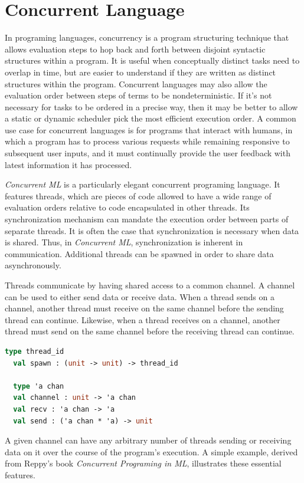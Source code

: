 \documentclass[10pt]{article}
\begin{document}
\section{Concurrent Language}
In programing languages, concurrency is a program structuring technique that allows evaluation
steps to hop back and forth between disjoint syntactic structures within a program.
It is useful
when conceptually distinct tasks need to overlap in time, but are easier to understand if they
are written as distinct structures within the program. Concurrent languages may also allow the
evaluation order between steps of terms to be nondeterministic. If it's not necessary for
tasks to be ordered in a precise way, then it may be better to allow a static or dynamic
scheduler pick the most efficient execution order. A common use case for concurrent languages
is for programs that interact with humans, in which a program has to process various requests
while remaining responsive to subsequent user inputs, and it must continually provide the user
feedback with latest information it has processed.

\textit{Concurrent ML} is a particularly elegant concurrent programing language.
It features threads, which are pieces of code allowed to have a wide range of
evaluation orders relative to code encapsulated in other threads. Its synchronization
mechanism can mandate the execution order between parts of separate threads. It is often the
case that synchronization is necessary when data is shared. Thus, in \textit{Concurrent ML},
synchronization is inherent in communication. Additional threads can be spawned
in order to share data asynchronously.

Threads communicate by having shared access to a common channel. A channel can be used to
either send data or receive data.  When a thread sends on a channel, another thread must
receive on the same channel before the sending thread can continue.  Likewise, when a thread
receives on a channel, another thread must send on the same channel before the receiving thread
can continue.

\begin{lstlisting}[language=ML]
  type thread_id
  val spawn : (unit -> unit) -> thread_id

  type 'a chan
  val channel : unit -> 'a chan
  val recv : 'a chan -> 'a
  val send : ('a chan * 'a) -> unit
  \end{lstlisting}

A given channel can have any arbitrary number of threads sending or receiving data on it over
the course of the program's execution. A simple example, derived from Reppy's book
\textit{Concurrent Programing in ML}, illustrates these essential
features.
\end{document}
